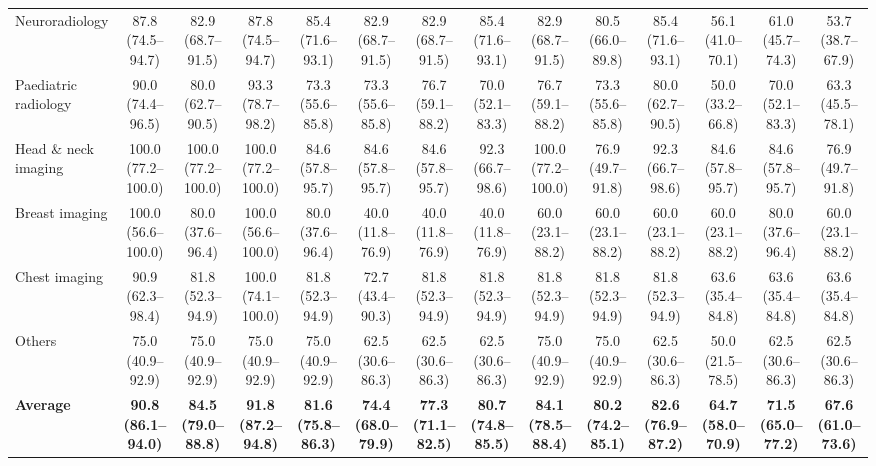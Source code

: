 \documentclass[10pt,journal,compsoc, onecolumn]{IEEEtran}
\begin{document}
\begin{table}
\begin{tabular}{l *{13}{c}}
Neuroradiology                & 87.8 (74.5--94.7) & 82.9 (68.7--91.5) & 87.8 (74.5--94.7) & 85.4 (71.6--93.1) & 82.9 (68.7--91.5) & 82.9 (68.7--91.5) & 85.4 (71.6--93.1) & 82.9 (68.7--91.5) & 80.5 (66.0--89.8) & 85.4 (71.6--93.1) & 56.1 (41.0--70.1) & 61.0 (45.7--74.3) & 53.7 (38.7--67.9) \\
Paediatric radiology          & 90.0 (74.4--96.5) & 80.0 (62.7--90.5) & 93.3 (78.7--98.2) & 73.3 (55.6--85.8) & 73.3 (55.6--85.8) & 76.7 (59.1--88.2) & 70.0 (52.1--83.3) & 76.7 (59.1--88.2) & 73.3 (55.6--85.8) & 80.0 (62.7--90.5) & 50.0 (33.2--66.8) & 70.0 (52.1--83.3) & 63.3 (45.5--78.1) \\
Head \& neck imaging          & 100.0 (77.2--100.0) & 100.0 (77.2--100.0) & 100.0 (77.2--100.0) & 84.6 (57.8--95.7) & 84.6 (57.8--95.7) & 84.6 (57.8--95.7) & 92.3 (66.7--98.6) & 100.0 (77.2--100.0) & 76.9 (49.7--91.8) & 92.3 (66.7--98.6) & 84.6 (57.8--95.7) & 84.6 (57.8--95.7) & 76.9 (49.7--91.8) \\
Breast imaging                & 100.0 (56.6--100.0) & 80.0 (37.6--96.4) & 100.0 (56.6--100.0) & 80.0 (37.6--96.4) & 40.0 (11.8--76.9) & 40.0 (11.8--76.9) & 40.0 (11.8--76.9) & 60.0 (23.1--88.2) & 60.0 (23.1--88.2) & 60.0 (23.1--88.2) & 60.0 (23.1--88.2) & 80.0 (37.6--96.4) & 60.0 (23.1--88.2) \\
Chest imaging                 & 90.9 (62.3--98.4) & 81.8 (52.3--94.9) & 100.0 (74.1--100.0) & 81.8 (52.3--94.9) & 72.7 (43.4--90.3) & 81.8 (52.3--94.9) & 81.8 (52.3--94.9) & 81.8 (52.3--94.9) & 81.8 (52.3--94.9) & 81.8 (52.3--94.9) & 63.6 (35.4--84.8) & 63.6 (35.4--84.8) & 63.6 (35.4--84.8) \\
Others                        & 75.0 (40.9--92.9) & 75.0 (40.9--92.9) & 75.0 (40.9--92.9) & 75.0 (40.9--92.9) & 62.5 (30.6--86.3) & 62.5 (30.6--86.3) & 62.5 (30.6--86.3) & 75.0 (40.9--92.9) & 75.0 (40.9--92.9) & 62.5 (30.6--86.3) & 50.0 (21.5--78.5) & 62.5 (30.6--86.3) & 62.5 (30.6--86.3) \\
\midrule
\textbf{Average}        & \textbf{90.8 (86.1--94.0)} &
\textbf{84.5 (79.0--88.8)} &
\textbf{91.8 (87.2--94.8)} &
\textbf{81.6 (75.8--86.3)} &
\textbf{74.4 (68.0--79.9)} &
\textbf{77.3 (71.1--82.5)} &
\textbf{80.7 (74.8--85.5)} &
\textbf{84.1 (78.5--88.4)} &
\textbf{80.2 (74.2--85.1)} &
\textbf{82.6 (76.9--87.2)} &
\textbf{64.7 (58.0--70.9)} &
\textbf{71.5 (65.0--77.2)} &
\textbf{67.6 (61.0--73.6)} \\
\bottomrule
\end{tabular}
\end{table}
\end{document}
